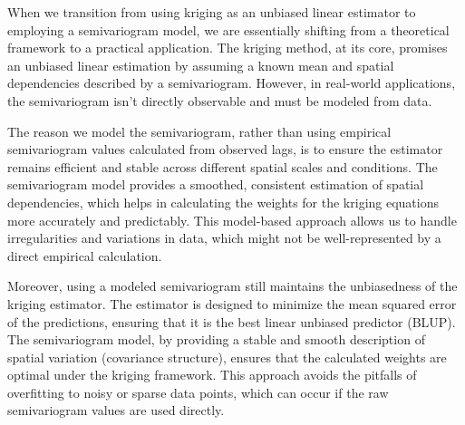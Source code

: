 \documentclass{article}
\begin{document}
When we transition from using kriging as an unbiased linear estimator to employing a semivariogram model, we are essentially shifting from a theoretical framework to a practical application. The kriging method, at its core, promises an unbiased linear estimation by assuming a known mean and spatial dependencies described by a semivariogram. However, in real-world applications, the semivariogram isn’t directly observable and must be modeled from data.

The reason we model the semivariogram, rather than using empirical semivariogram values calculated from observed lags, is to ensure the estimator remains efficient and stable across different spatial scales and conditions. The semivariogram model provides a smoothed, consistent estimation of spatial dependencies, which helps in calculating the weights for the kriging equations more accurately and predictably. This model-based approach allows us to handle irregularities and variations in data, which might not be well-represented by a direct empirical calculation.

Moreover, using a modeled semivariogram still maintains the unbiasedness of the kriging estimator. The estimator is designed to minimize the mean squared error of the predictions, ensuring that it is the best linear unbiased predictor (BLUP). The semivariogram model, by providing a stable and smooth description of spatial variation (covariance structure), ensures that the calculated weights are optimal under the kriging framework. This approach avoids the pitfalls of overfitting to noisy or sparse data points, which can occur if the raw semivariogram values are used directly.
\end{document}
